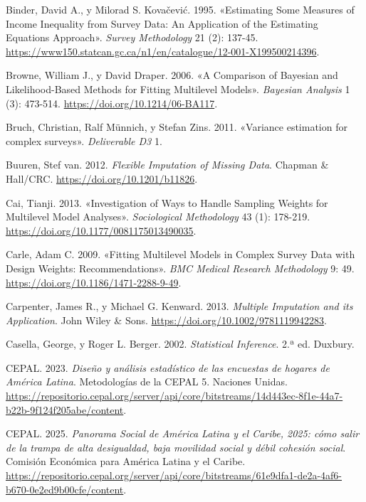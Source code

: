 \documentclass[
  spanish,
  11pt,
  letterpaper,
  oneside,
  open=any]{scrbook}
\newlength{\cslhangindent}
\newenvironment{CSLReferences}[2] %
 {\begin{list}{}{%
  \setlength{\itemindent}{0pt}
  \setlength{\leftmargin}{0pt}
  \setlength{\parsep}{0pt}
  \ifodd #1
   \setlength{\leftmargin}{\cslhangindent}
   \setlength{\itemindent}{-1\cslhangindent}
  \fi
  \setlength{\itemsep}{#2\baselineskip}}}
 {\end{list}}
\begin{document}
\begin{CSLReferences}{1}{1}
Binder, David A., y Milorad S. Kovačević. 1995. {«Estimating Some
Measures of Income Inequality from Survey Data: An Application of the
Estimating Equations Approach»}. \emph{Survey Methodology} 21 (2):
137-45.
\url{https://www150.statcan.gc.ca/n1/en/catalogue/12-001-X199500214396}.

Browne, William J., y David Draper. 2006. {«A Comparison of Bayesian and
Likelihood-Based Methods for Fitting Multilevel Models»}. \emph{Bayesian
Analysis} 1 (3): 473-514. \url{https://doi.org/10.1214/06-BA117}.

Bruch, Christian, Ralf Münnich, y Stefan Zins. 2011. {«Variance
estimation for complex surveys»}. \emph{Deliverable D3} 1.

Buuren, Stef van. 2012. \emph{Flexible Imputation of Missing Data}.
Chapman \& Hall/CRC. \url{https://doi.org/10.1201/b11826}.

Cai, Tianji. 2013. {«Investigation of Ways to Handle Sampling Weights
for Multilevel Model Analyses»}. \emph{Sociological Methodology} 43 (1):
178-219. \url{https://doi.org/10.1177/0081175013490035}.

Carle, Adam C. 2009. {«Fitting Multilevel Models in Complex Survey Data
with Design Weights: Recommendations»}. \emph{BMC Medical Research
Methodology} 9: 49. \url{https://doi.org/10.1186/1471-2288-9-49}.

Carpenter, James R., y Michael G. Kenward. 2013. \emph{Multiple
Imputation and its Application}. John Wiley \& Sons.
\url{https://doi.org/10.1002/9781119942283}.

Casella, George, y Roger L. Berger. 2002. \emph{Statistical Inference}.
2.ª ed. Duxbury.

CEPAL. 2023. \emph{Diseño y análisis estadístico de las encuestas de
hogares de América Latina}. Metodologías de la CEPAL 5. Naciones Unidas.
\url{https://repositorio.cepal.org/server/api/core/bitstreams/14d443ec-8f1e-44a7-b22b-9f124f205abe/content}.

CEPAL. 2025. \emph{Panorama Social de América Latina y el Caribe, 2025:
cómo salir de la trampa de alta desigualdad, baja movilidad social y
débil cohesión social}. {Comisión Económica para América Latina y el
Caribe}.
\url{https://repositorio.cepal.org/server/api/core/bitstreams/61e9dfa1-de2a-4af6-b670-0e2ed9b00cfe/content}.


\end{CSLReferences}
\end{document}
